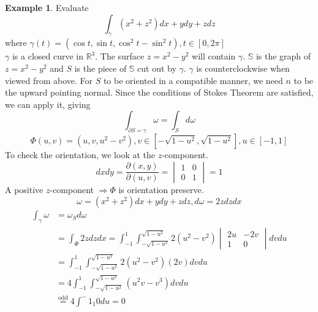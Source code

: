 \documentclass[12pt]{article}
\theoremstyle{plain}
\theoremstyle{definition}
\newtheorem{example}[theorem]{Example}
\begin{document}
\begin{example}
	Evaluate
	$$\int_\gamma (x^2 + z^2)dx + ydy + zdz$$
	where $\gamma (t) = (\cos t, \sin t, \cos^2 t - \sin^2 t), t \in [0,2\pi]$\\
	$\gamma$ is a closed curve in $\mathbb{R}^3$. The surface $z=x^2-y^2$ will contain $\gamma$. $\mathbb{S}$ is the graph of $z=x^2-y^2$ and $S$ is the piece of $\mathbb{S}$ cut out by $\gamma$. $\gamma$ is counterclockwise when viewed from above. For $S$ to be oriented in a compatible manner, we need $n$ to be the upward pointing normal. Since the conditions of Stokes Theorem are satisfied, we can apply it, giving
	$$\int_{\partial S =\gamma} \omega = \int_S d\omega$$
	$$\Phi (u,v) = (u,v, u^2-v^2), v \in [-\sqrt{1-u^2}, \sqrt{1-u^2}], u\in [-1,1]$$
	To check the orientation, we look at the $z$-component.
	$$dxdy = \frac{\partial (x,y)}{\partial (u,v)} = \begin{vmatrix}
1 & 0 \\
0 & 1
\end{vmatrix} = 1$$
A positive $z$-component $\Longrightarrow \Phi$ is orientation preserve.
$$\omega = (x^2 + z^2)dx + ydy + zdz, d\omega = 2zdzdx$$
\begin{align*}
	\int_\gamma \omega &= \omega_S d\omega\\
	&= \int_\Phi 2zdzdx = \int^1_{-1} \int^{\sqrt{1-u^2}}_{-\sqrt{1-u^2}} 2(u^2-v^2) \begin{vmatrix}
2u & -2v \\
1 & 0
\end{vmatrix}dv du\\
&= \int^1_{-1} \int^{\sqrt{1-u^2}}_{-\sqrt{1-u^2}} 2(u^2-v^2) (2v)dv du\\
&= 4\int^1_{-1} \int^{\sqrt{1-u^2}}_{-\sqrt{1-u^2}} (u^2v-v^3)dvdu\\
&\overset{\text{odd}}{=} 4 \int^-1_1 0 du = 0
\end{align*}
\end{example}
\end{document}
